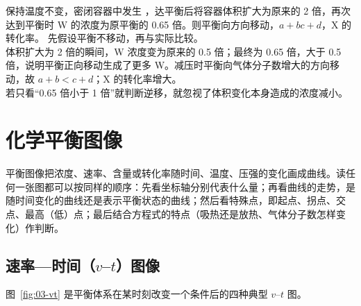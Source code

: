 \begin{liti}[浓度变化倍数的分析]
保持温度不变，密闭容器中发生 ，达平衡后将容器体积扩大为原来的 2 倍，再次达到平衡时 W 的浓度为原平衡的 0.65 倍。则平衡向\tk{}方向移动，$a+b$\tk$c+d$，X 的转化率\tk。
\tcblower
\silu 先假设平衡不移动，再与实际比较。\\
\jie 体积扩大为 2 倍的瞬间，W 浓度变为原来的 0.5 倍；最终为 0.65 倍，大于 0.5 倍，说明平衡正向移动生成了更多 W。减压时平衡向气体分子数增大的方向移动，故 $a+b<c+d$；X 的转化率增大。\\
\xianjing 若只看“0.65 倍小于 1 倍”就判断逆移，就忽视了体积变化本身造成的浓度减小。
\end{liti}

\section{化学平衡图像}

平衡图像把浓度、速率、含量或转化率随时间、温度、压强的变化画成曲线。读任何一张图都可以按同样的顺序：先看坐标轴分别代表什么量；再看曲线的走势，是随时间变化的曲线还是表示平衡状态的曲线；然后看特殊点，即起点、拐点、交点、最高（低）点；最后结合方程式的特点（吸热还是放热、气体分子数怎样变化）作判断。

\subsection{速率—时间（$v$–$t$）图像}
图~\ref{fig:03-vt} 是平衡体系在某时刻改变一个条件后的四种典型 $v$–$t$ 图。

